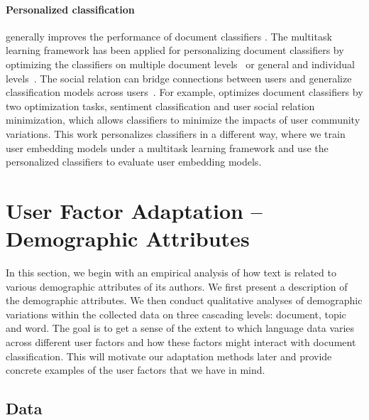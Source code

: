 \paragraph{Personalized classification} 
generally improves the performance of document classifiers \cite{flek2020returning}.
The multitask learning framework has been applied for personalizing document classifiers by optimizing the classifiers on multiple document levels~\cite{benton2017multitask} or general and individual levels~\cite{wu2016personalized}.
The social relation can bridge connections between users and generalize classification models across users~\cite{wu2016personalized, yang2017overcoming}. 
For example, \cite{wu2016personalized} optimizes document classifiers by two optimization tasks, sentiment classification and user social relation minimization, which allows classifiers to minimize the impacts of user community variations.
This work personalizes classifiers in a different way, where we train user embedding models under a multitask learning framework and use the personalized classifiers to evaluate user embedding models.




\section{User Factor Adaptation -- Demographic Attributes}
\label{chap4:sec:daa}

In this section, we begin with an empirical analysis of how text is related to various demographic attributes of its authors. We first present a description of the demographic attributes. We then conduct qualitative analyses of demographic variations within the collected data on three cascading levels: document, topic and word.
The goal is to get a sense of the extent to which language data varies across different user factors and how these factors might interact with document classification. 
This will motivate our adaptation methods later and provide concrete examples of the user factors that we have in mind.


\subsection{Data}
\label{chap4:subsec:data1}

